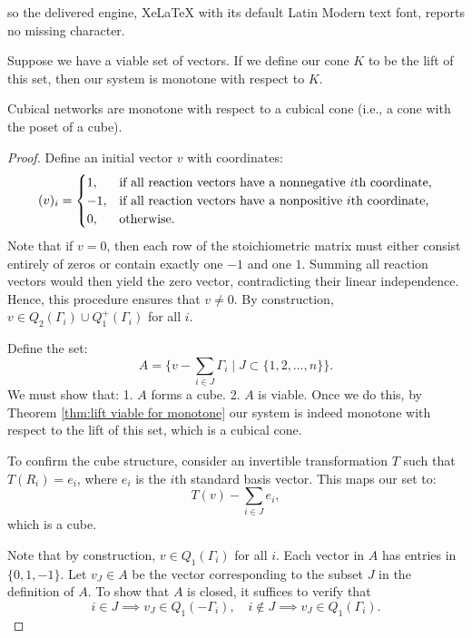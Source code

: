 \documentclass[10pt,a4paper]{amsart}
\begin{document}
so the delivered engine, XeLaTeX with its default Latin Modern text font, reports no missing character.
\begin{thm}
\label{thm:lift viable for monotone}
     Suppose we have a viable set of vectors. If we define our cone $K$ to be the lift of this set, then our system is monotone with respect to $K$. 
\end{thm}

\begin{thm}
\label{thm:cubical network cones}
    Cubical networks are monotone with respect to a cubical cone (i.e., a cone with the poset of a cube). 
\end{thm}

\begin{proof}

Define an initial vector \( v \) with coordinates:
    \[
    (v)_i =
    \begin{cases}
        1, & \text{if all reaction vectors have a nonnegative \( i \)th coordinate,} \\
        -1, & \text{if all reaction vectors have a nonpositive \( i \)th coordinate,} \\
        0, & \text{otherwise.}
    \end{cases}
    \]
    Note that if \( v = 0 \), then each row of the stoichiometric matrix must either consist entirely of zeros or contain exactly one \(-1\) and one \(1\). Summing all reaction vectors would then yield the zero vector, contradicting their linear independence. Hence, this procedure ensures that \( v \neq 0 \). By construction, \( v \in Q_2(\Gamma_i) \cup Q_1^+(\Gamma_i) \) for all \( i \).

    Define the set:
    \[
    A = \{ v - \sum_{i \in J}  \Gamma_i \mid J \subset \{1,2,\dots,n\}
     \}.
    \]
    We must show that:
    1. \( A \) forms a cube.
    2. \( A \) is viable. Once we do this, by Theorem \ref{thm:lift viable for monotone} our system is indeed monotone with respect to the lift of this set, which is a cubical cone.

 To confirm the cube structure, consider an invertible transformation \( T \) such that \( T(R_i) = e_i \), where \( e_i \) is the \( i \)th standard basis vector. This maps our set to:
\[
 T(v) - \sum_{i \in J} e_i,
 \]
 which is a cube.


 Note that by construction, \( v \in Q_1(\Gamma_i) \) for all \( i \). Each vector in \( A \) has entries in \( \{0,1,-1\} \). Let \( v_J \in A \) be the vector corresponding to the subset \( J \) in the definition of \( A \). To show that \( A \) is closed, it suffices to verify that  
\[
i \in J \implies v_J \in Q_1(-\Gamma_i), \quad i \notin J \implies v_J \in Q_1(\Gamma_i).
\]


\end{proof}
\end{document}
